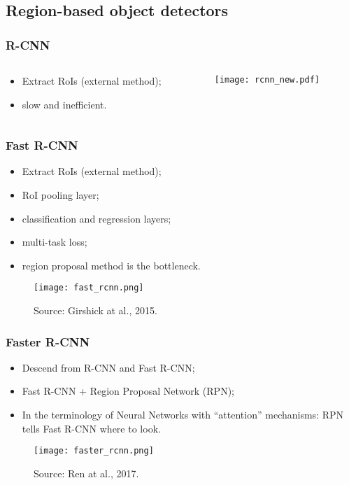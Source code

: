 \documentclass{beamer}
\begin{document}
		\subsection{Region-based object detectors}

		\begin{frame}\frametitle{R-CNN}
			\begin{columns}
				\begin{column}{0.5\textwidth}
					\begin{itemize}
						\item Extract RoIs (external method);
						\item slow and inefficient.
					\end{itemize}
				\end{column}
				\begin{column}{0.5\textwidth}
					\begin{figure}[th!]
						\centering
						\texttt{[image: rcnn\_new.pdf]}
						\label{fig:R-CNN}
					\end{figure}
				\end{column}
			\end{columns}
		\end{frame}



		\begin{frame}\frametitle{Fast R-CNN}
			\begin{itemize}
				\item Extract RoIs (external method);
				\item RoI pooling layer;
				\item classification and regression layers;
				\item multi-task loss;
				\item region proposal method is the bottleneck.
			\end{itemize}
			\begin{figure}[th!]
				\centering
				\texttt{[image: fast\_rcnn.png]}
				\caption{Source: {Girshick at al., 2015}.
				}
				\label{fig:Fast_R-CNN}
			\end{figure}
		\end{frame}


		\begin{frame}\frametitle{Faster R-CNN}
			\begin{itemize}
				\item Descend from R-CNN and Fast R-CNN;
				\item Fast R-CNN + Region Proposal Network (RPN);
				\item In the terminology of Neural Networks with “attention” mechanisms:
				RPN tells Fast R-CNN where to look.
			\end{itemize}
			\begin{figure}[th!]
				\centering
				\texttt{[image: faster\_rcnn.png]}
				\caption{Source: {Ren at al., 2017}.
				}
				\label{fig:Faster_R-CNN}
			\end{figure}
		\end{frame}
\end{document}
